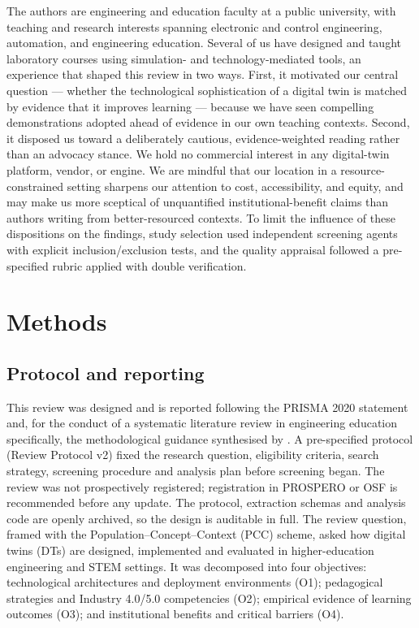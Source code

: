 The authors are engineering and education faculty at a public university, with
teaching and research interests spanning electronic and control engineering,
automation, and engineering education. Several of us have designed and taught
laboratory courses using simulation- and technology-mediated tools, an
experience that shaped this review in two ways. First, it motivated our central
question --- whether the technological sophistication of a digital twin is matched
by evidence that it improves learning --- because we have seen compelling
demonstrations adopted ahead of evidence in our own teaching contexts. Second, it
disposed us toward a deliberately cautious, evidence-weighted reading rather than
an advocacy stance. We hold no commercial interest in any digital-twin platform,
vendor, or engine. We are mindful that our location in a resource-constrained
setting sharpens our attention to cost, accessibility, and equity, and may make
us more sceptical of unquantified institutional-benefit claims than authors
writing from better-resourced contexts. To limit the influence of these
dispositions on the findings, study selection used independent screening agents
with explicit inclusion/exclusion tests, and the quality appraisal followed a
pre-specified rubric applied with double verification.

\section{Methods}\label{methods}

\subsection{Protocol and reporting}\label{protocol-and-reporting}

This review was designed and is reported following the PRISMA 2020 statement and,
for the conduct of a systematic literature review in engineering education
specifically, the methodological guidance synthesised by \cite{borrego_systematic_2014}.
A pre-specified protocol (Review Protocol v2) fixed the research question,
eligibility criteria, search strategy, screening procedure and analysis plan
before screening began. The review was not prospectively registered; registration
in PROSPERO or OSF is recommended before any update. The protocol, extraction
schemas and analysis code are openly archived, so the design is auditable in full. The review question, framed with the
Population--Concept--Context (PCC) scheme, asked how digital twins (DTs) are
designed, implemented and evaluated in higher-education engineering and STEM
settings. It was decomposed into four objectives: technological architectures and
deployment environments (O1); pedagogical strategies and Industry 4.0/5.0
competencies (O2); empirical evidence of learning outcomes (O3); and institutional
benefits and critical barriers (O4).

